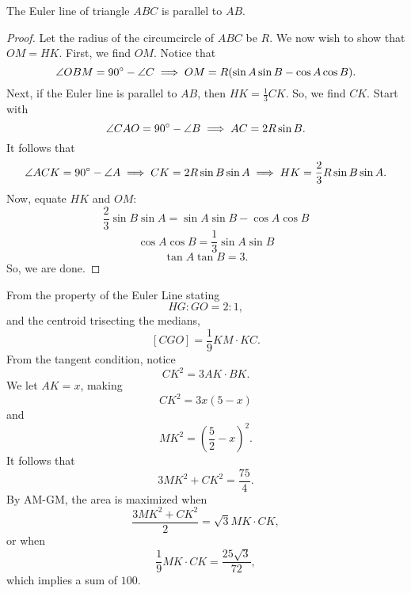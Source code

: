 \documentclass[11pt]{scrartcl}
\begin{document}
\begin{claim*}
    The Euler line of triangle $ABC$ is parallel to $AB$.
\end{claim*}
\begin{proof}
    Let the radius of the circumcircle of $ABC$ be $R$. We now wish to show that $OM = HK$. First, we find $OM$. Notice that
    \[\angle OBM = 90^\circ - \angle C \implies OM = R(\sin A \sin B - \cos A \cos B).\]
    Next, if the Euler line is parallel to $AB$, then $HK = \frac{1}{3}CK$. So, we find $CK$. Start with
    \[\angle CAO = 90^\circ - \angle B \implies AC = 2R \sin B.\]
    It follows that
    \[\angle ACK = 90^\circ - \angle A \implies CK = 2R \sin B \sin A \implies HK = \frac{2}{3}R \sin B \sin A.\]
    Now, equate $HK$ and $OM$:
    \[\frac{2}{3} \sin B \sin A = \sin A \sin B - \cos A \cos B\]
    \[\cos A \cos B = \frac{1}{3}\sin A \sin B\]
    \[\tan A \tan B = 3.\]
    So, we are done.
\end{proof}

From the property of the Euler Line stating
\[HG : GO = 2 : 1,\]
and the centroid trisecting the medians,
\[[CGO] = \frac{1}{9}KM \cdot KC.\]
From the tangent condition, notice
\[CK^{2} = 3AK \cdot BK.\]
We let $AK = x$, making
\[CK^{2} = 3x(5 - x)\]
and
\[MK^{2} = \left(\frac{5}{2} - x\right)^{2}.\]
It follows that
\[3MK^{2} + CK^{2} = \frac{75}{4}.\]
By AM-GM, the area is maximized when
\[\frac{3MK^{2} + CK^{2}}{2} = \sqrt{3}MK \cdot CK,\]
or when
\[\frac{1}{9}MK \cdot CK = \frac{25\sqrt{3}}{72},\]
which implies a sum of $\boxed{100}$.
\end{document}
